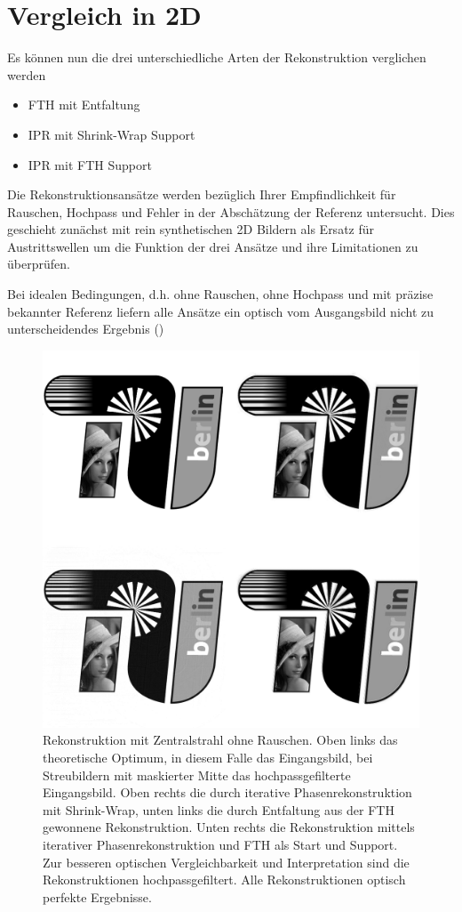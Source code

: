 \section{Vergleich in 2D}	
Es können nun die drei unterschiedliche Arten der Rekonstruktion verglichen werden
\begin{itemize}
	\item FTH mit Entfaltung
	\item IPR mit Shrink-Wrap Support
	\item IPR mit FTH Support
\end{itemize}

Die Rekonstruktionsansätze werden bezüglich Ihrer Empfindlichkeit für Rauschen, Hochpass und Fehler in der Abschätzung der Referenz untersucht. Dies geschieht zunächst mit rein synthetischen 2D Bildern als Ersatz für Austrittswellen um die Funktion der drei Ansätze und ihre Limitationen zu überprüfen.

Bei idealen Bedingungen, d.h. ohne Rauschen, ohne Hochpass und mit präzise bekannter Referenz liefern alle Ansätze ein optisch vom Ausgangsbild nicht zu unterscheidendes Ergebnis ()

\begin{figure}
	\includegraphics[width=.48\textwidth]{images/recon2d-perfect.png}
	\caption[2D Rekonstruktion: Ideal]{Rekonstruktion mit Zentralstrahl ohne Rauschen. Oben links das theoretische Optimum, in diesem Falle das Eingangsbild, bei Streubildern mit maskierter Mitte das hochpassgefilterte Eingangsbild. Oben rechts die durch iterative Phasenrekonstruktion mit Shrink-Wrap, unten links die durch Entfaltung  aus der FTH gewonnene Rekonstruktion. Unten rechts die Rekonstruktion mittels iterativer Phasenrekonstruktion und FTH als Start und Support. Zur besseren optischen Vergleichbarkeit und Interpretation sind die Rekonstruktionen hochpassgefiltert. Alle Rekonstruktionen optisch perfekte Ergebnisse.}
	\label{fig:recon2d-perfect}
\end{figure}


